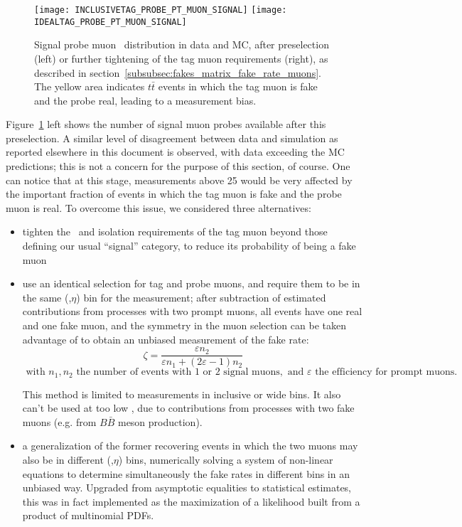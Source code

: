 \begin{figure}[t!]
\centering
\texttt{[image: INCLUSIVETAG\_PROBE\_PT\_MUON\_SIGNAL]}
\texttt{[image: IDEALTAG\_PROBE\_PT\_MUON\_SIGNAL]}
\caption
{Signal probe muon \pt\ distribution in data and MC, after preselection (left) 
or further tightening of the tag muon requirements (right), 
as described in section~\ref{subsubsec:fakes_matrix_fake_rate_muons}. 
The yellow area indicates $t\bar t$ events in which the tag muon is fake and the probe real, 
leading to a measurement bias. 
}
\label{Fig:fakes_preselection_muon}
\end{figure}

Figure~\ref{Fig:fakes_preselection_muon} left shows the number of signal muon probes available after this preselection. 
A similar level of disagreement between data and simulation as reported elsewhere in this document is observed, 
with data exceeding the MC predictions; this is not a concern for the purpose of this section, of course. 
One can notice that at this stage, measurements above 25 \GeV would be very affected by the important fraction of events 
in which the tag muon is fake and the probe muon is real. 
To overcome this issue, we considered three alternatives: 
\begin{itemize}
\item tighten the \pt\ and isolation requirements of the tag muon beyond those defining our usual ``signal'' category, 
to reduce its probability of being a fake muon
\item use an identical selection for tag and probe muons, and require them to be in the same (\pt,$\eta$) bin for the measurement; 
after subtraction of estimated contributions from processes with two prompt muons, all events have one real and one fake muon, 
and the symmetry in the muon selection can be taken advantage of to obtain an unbiased measurement of the fake rate: 
$$
\zeta = \frac{\varepsilon n_2}{\varepsilon n_1+(2\varepsilon-1)n_2}
$$
$\text{ with }n_1, n_2\text{ the number of events with 1 or 2 signal muons}, 
\text{ and }\varepsilon\text{ the efficiency for prompt muons.}$

This method is limited to measurements in inclusive or wide bins. 
It also can't be used at too low \pt, due to contributions from processes with two fake muons (e.g. from $B\bar B$ meson production). 
\item a generalization of the former recovering events in which the two muons may also be in different (\pt,$\eta$) bins, 
numerically solving a system of non-linear equations 
to determine simultaneously the fake rates in different bins in an unbiased way. 
Upgraded from asymptotic equalities to statistical estimates, 
this was in fact implemented as the maximization of a likelihood built from a product of multinomial PDFs. 
\end{itemize}
